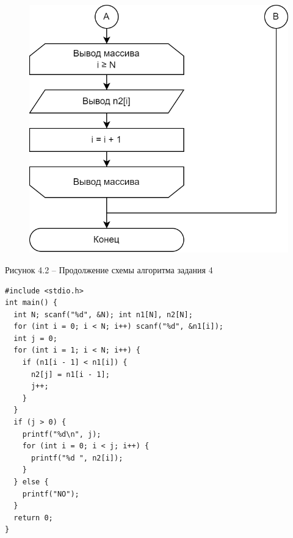 \documentclass[a4paper,14pt]{extarticle}
\begin{document}
  \pagebreak
  \begin{figure}[h]
    \centering
    \includegraphics[width=0.45\linewidth]{schemes/s-4-2}
  \end{figure}
  \begin{center}
    Рисунок 4.2 – Продолжение схемы алгоритма задания 4
  \end{center}
  \begin{lstlisting}[tabsize=2,basicstyle=\ttfamily]
#include <stdio.h>
int main() {
  int N; scanf("%d", &N); int n1[N], n2[N];
  for (int i = 0; i < N; i++) scanf("%d", &n1[i]);
  int j = 0;
  for (int i = 1; i < N; i++) {
    if (n1[i - 1] < n1[i]) {
      n2[j] = n1[i - 1];
      j++;
    }
  }
  if (j > 0) {
    printf("%d\n", j);
    for (int i = 0; i < j; i++) {
      printf("%d ", n2[i]);
    }
  } else {
    printf("NO");
  }
  return 0;
}
  \end{lstlisting}

  \newpage
\end{document}
